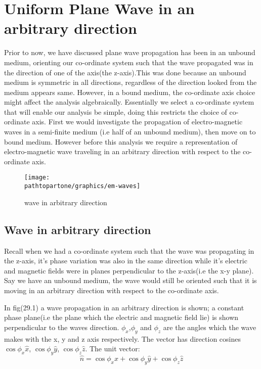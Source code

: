 \chapter{Uniform Plane Wave in an arbitrary direction}\label{lec:lec29}

Prior to now, we have discussed  plane wave propagation has been in an unbound medium, orienting our co-ordinate system such that the wave propagated was in the direction of one of the axis(the z-axis).This was done because an unbound medium is symmetric in all directions, regardless of the direction looked from the medium appears same.
However, in a bound medium, the co-ordinate axis choice might affect the analysis algebraically.
Essentially we select a co-ordinate system that will enable our analysis be simple, doing this restricts the choice of co-ordinate axis. First we would investigate the propagation of electro-magnetic waves in a semi-finite medium (i.e half of an unbound medium), then move on to bound medium. However before this analysis we require a representation of electro-magnetic wave traveling in an arbitrary direction with respect to the co-ordinate axis.
\begin{figure}[h]
\centering
\texttt{[image: \\pathtopartone/graphics/em-waves]}
\caption{wave in arbitrary direction}
\end{figure}

\section{Wave in arbitrary direction}
Recall when we had a co-ordinate system such that the wave was propagating in the z-axis, it's phase variation was also in the same direction while it's electric and magnetic fields were in planes perpendicular to the z-axis(i.e the x-y plane).
Say we have an unbound medium, the wave would still be oriented such that it is moving in an arbitrary direction with respect to the co-ordinate axis.

In fig(29.1) a wave propagation in an arbitrary direction is shown; a constant phase plane(i.e the plane which the electric and magnetic field lie) is shown perpendicular to the waves direction.
$\phi_{x}$,$\phi_{y}$ and $\phi_{z}$ are the angles which the wave makes with the x, y and z axis respectively. 
The vector has direction cosines $\cos\phi_{x}\hat{x}$, $\cos\phi_{y}\hat{y}$, $\cos\phi_{z}\hat{z}$. The unit vector:
\begin{equation}
\hat{n} = \cos\phi_{x}\hat{x} + \cos\phi_{y}\hat{y} + \cos\phi_{z}\hat{z}
\end{equation}

